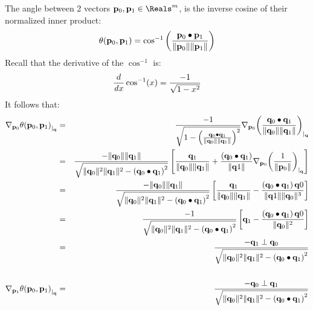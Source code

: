 The angle between 2 vectors $\p_0, \p_1 \in \Reals^m$, is the inverse cosine
of their normalized inner product:
\begin{equation}
\theta({\mathbf p}_0,{\mathbf p}_1)
=
\cos^{-1}
\left(
{ {\mathbf p}_0 \bullet {\mathbf p}_1 } \over {\|{\mathbf p}_0\| \|{\mathbf p}_1\|}
\right)
\end{equation}
Recall that the derivative of the $\cos^{-1}$ is:
\begin{equation}
\frac{d}{\mathit dx} \cos^{-1}(x) = { -1 \over \sqrt{1 - x^2} }
\end{equation}
It follows that:
\begin{eqnarray}
\label{eq:angle_gradient}
{\mathbf \nabla}_{{\mathbf p}_0}{{\theta({\mathbf p}_0,{\mathbf p}_1)}}_{\mid_{{\mathbf q}}}
& = &
{{-1} \over
{ \sqrt{1 - \left( {{\mathbf q}_0 \bullet {\mathbf q}_1} \over {\| {\mathbf q}_0 \| \| {\mathbf q}_1 \|} \right)^2 }}}
{\mathbf \nabla}_{{\mathbf p}_0}{{\left( {{\mathbf q}_0 \bullet {\mathbf q}_1} \over {\| {\mathbf q}_0 \| \| {\mathbf q}_1 \|} \right)}}_{\mid_{{\mathbf q}}}
\\
& = &
{
{-\|{\mathbf q}_0\|\|{\mathbf q}_1\|}
\over
{ \sqrt{\|{\mathbf q}_0\|^2\|{\mathbf q}_1\|^2 - \left( {\mathbf q}_0 \bullet {\mathbf q}_1 \right)^2 }}
}
\left[
{{{\mathbf q}_1} \over {\|{\mathbf q}_0\|\|{\mathbf q}_1\|}}
+
{{\left( {\mathbf q}_0 \bullet {\mathbf q}_1 \right)} \over {\| {\mathbf q}1 \|}}
{\mathbf \nabla}_{{\mathbf p}_0}{{\left( {1} \over {\| {\mathbf p}_0 \|} \right)}}_{\mid_{{\mathbf q}}}
\right]
\nonumber
\\
& = &
{
{-\|{\mathbf q}_0\|\|{\mathbf q}_1\|}
\over
{ \sqrt{\|{\mathbf q}_0\|^2\|{\mathbf q}_1\|^2 - \left( {\mathbf q}_0 \bullet {\mathbf q}_1 \right)^2 }}
}
\left[
{{{\mathbf q}_1} \over {\|{\mathbf q}_0\|\|{\mathbf q}_1\|}}
-
{{\left( {\mathbf q}_0 \bullet {\mathbf q}_1 \right) {\mathbf q}0} \over {\| {\mathbf q}1 \| \|{\mathbf q}_0\|^3}}
\right]
\nonumber
\\
& = &
{
{-1}
\over
{ \sqrt{\|{\mathbf q}_0\|^2\|{\mathbf q}_1\|^2 - \left( {\mathbf q}_0 \bullet {\mathbf q}_1 \right)^2 }}
}
\left[
{\mathbf q}_1
-
{{\left( {\mathbf q}_0 \bullet {\mathbf q}_1 \right) {\mathbf q}0} \over {\|{\mathbf q}_0\|^2}}
\right]
\nonumber
\\
& = &
{
{- {\mathbf q}_1 \perp {\mathbf q}_0}
\over
{ \sqrt{\|{\mathbf q}_0\|^2\|{\mathbf q}_1\|^2 - \left( {\mathbf q}_0 \bullet {\mathbf q}_1 \right)^2 }}
}
\nonumber
\\
&  &
\nonumber
\\
{\mathbf \nabla}_{{\mathbf p}_1}{{\theta({\mathbf p}_0,{\mathbf p}_1)}}_{\mid_{{\mathbf q}}}
& = &
{
{- {\mathbf q}_0 \perp {\mathbf q}_1}
\over
{ \sqrt{\|{\mathbf q}_0\|^2\|{\mathbf q}_1\|^2 - \left( {\mathbf q}_0 \bullet {\mathbf q}_1 \right)^2 }}
}
\nonumber
\end{eqnarray}